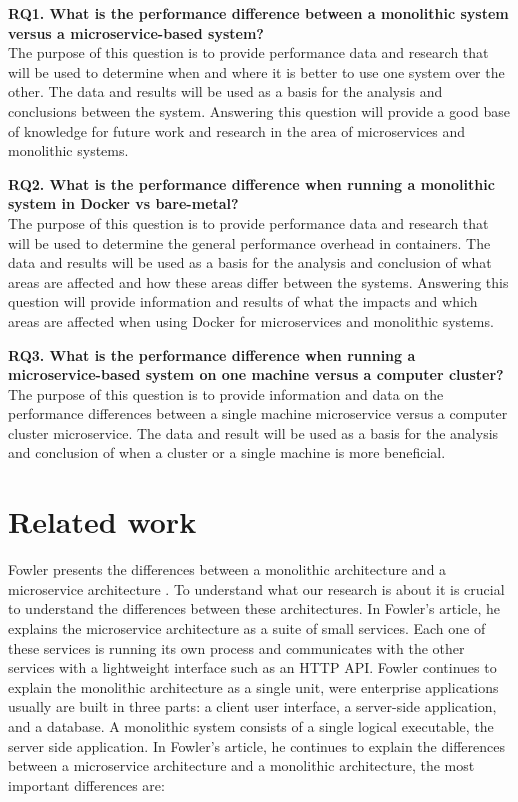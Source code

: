 \documentclass[a4paper,oneside]{bth}
\begin{document}
\textbf{RQ1. What is the performance difference between a monolithic system versus a microservice-based system?}\\
The purpose of this question is to provide performance data and research that will be used to determine when and where it is better to use one system over the other. The data and results will be used as a basis for the analysis and conclusions between the system. Answering this question will provide a good base of knowledge for future work and research in the area of microservices and monolithic systems.

\par\vspace {0.5cm}
\textbf{RQ2. What is the performance difference when running a monolithic system in Docker vs bare-metal?}\\
The purpose of this question is to provide performance data and research that will be used to determine the general performance overhead in containers. The data and results will be used as a basis for the analysis and conclusion of what areas are affected and how these areas differ between the systems. Answering this question will provide information and results of what the impacts and which areas are affected when using Docker for microservices and monolithic systems.

\par\vspace {0.5cm}
\textbf{RQ3. What is the performance difference when running a microservice-based system on one machine versus a computer cluster?}\\
The purpose of this question is to provide information and data on the performance differences between a single machine microservice versus a computer cluster microservice. The data and result will be used as a basis for the analysis and conclusion of when a cluster or a single machine is more beneficial.


\chapter{Related work} \label{relatedWork}

Fowler presents the differences between a monolithic architecture and a microservice architecture \cite{Fowler}. To understand what our research is about it is crucial to understand the differences between these architectures. In Fowler’s article, he explains the microservice architecture as a suite of small services. Each one of these services is running its own process and communicates with the other services with a lightweight interface such as an HTTP API. Fowler continues to explain the monolithic architecture as a single unit, were enterprise applications usually are built in three parts: a client user interface, a server-side application, and a database. A monolithic system consists of a single logical executable, the server side application. In Fowler’s article, he continues to explain the differences between a microservice architecture and a monolithic architecture, the most important differences are:
\end{document}
